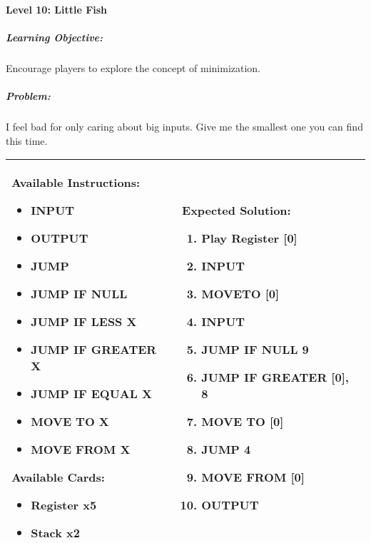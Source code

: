 \paragraph{Level 10: Little Fish}
\subparagraph{Learning Objective:} Encourage players to explore the concept of minimization.

\subparagraph{Problem:} I feel bad for only caring about big inputs. Give me the smallest one you can find this time.

\begin{center}
    \begin{tabular}{ | m{6cm} | m{8cm} | } 
        \hline
            \textbf{Available Instructions:} 
            \begin{itemize}
                \setlength\itemsep{-.35em}
                \item INPUT
                \item OUTPUT
                \item JUMP
                \item JUMP IF NULL
                \item JUMP IF LESS X
                \item JUMP IF GREATER X
		\item JUMP IF EQUAL X
                \item MOVE TO X
                \item MOVE FROM X
            \end{itemize}
            \textbf{Available Cards:} 
            \begin{itemize}
                \setlength\itemsep{-.35em}
                \item Register x5
                \item Stack x2
            \end{itemize}& 
            \textbf{Expected Solution:} 
            \begin{enumerate}
                \setlength\itemsep{-.35em}
                \item Play Register [0]
                \item INPUT
                \item MOVETO [0]
                \item INPUT
                \item JUMP IF NULL 9
                \item JUMP IF GREATER [0], 8
                \item MOVE TO [0]
                \item JUMP 4
                \item MOVE FROM [0]
                \item OUTPUT
            \end{enumerate}
            \\
        \hline
    \end{tabular}
\end{center}


